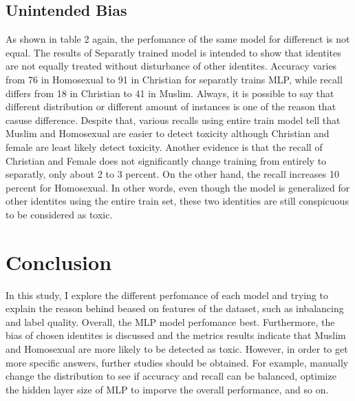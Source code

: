 \documentclass[11pt,twocolumn]{article}
\begin{document}
\subsection{Unintended Bias}
As shown in table 2 again, the perfomance of the same model for differenct is not equal. The results of Separatly trained model is intended to show that identites are not equally treated 
without disturbance of other identites. Accuracy varies from 76 in Homosexual to 91 in Christian for separatly trains MLP, while recall differs from 18 in Christian to 41 in Muslim. Always, 
it is possible to say that different distribution or different amount of instances is one of the reason that casuse difference. Despite that, various recalls using entire train model tell 
that Muslim and Homosexual are easier to detect toxicity although Christian and female are least likely detect toxicity. Another evidence is that the recall of Christian and Female does not 
significantly change training from entirely to separatly, only about 2 to 3 percent. On the other hand, the recall increases 10 percent for Homosexual. In other words, even though the model 
is generalized for other identites using the entire train set, these two identities are still conspicuous to be considered as toxic.

 
\section{Conclusion}
In this study, I explore the different perfomance of each model and trying to explain the reason behind beased on features of the dataset, such as inbalancing and label quality. Overall, the MLP model perfomance best.
Furthermore, the bias of chosen identites is discussed and the metrics results indicate that Muslim and Homosexual are more likely to be detected as toxic. However, in order to get more specific answers, further 
studies should be obtained. For example, manually change the distribution to see if accuracy and recall can be balanced, optimize the hidden layer size of MLP to imporve the overall performance, and so on.


\end{document}
